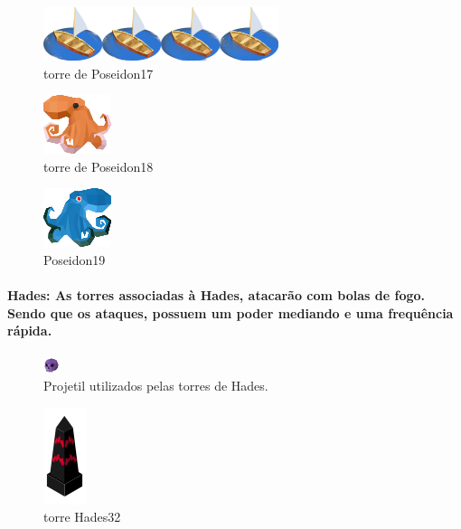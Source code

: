 \documentclass[11pt]{article} %
\begin{document}
\begin{figure}[!htp]
\centering
\includegraphics[scale=1.3]{res/towers/tower_17.png}
\caption{torre de Poseidon17}
\end{figure}


\begin{figure}[!htp]
\centering
\includegraphics[scale=1.3]{res/towers/tower_18.png}
\caption{torre de Poseidon18}
\end{figure}


\begin{figure}[!htp]
\centering
\includegraphics[scale=1.3]{res/towers/tower_19.png}
\caption{Poseidon19}
\end{figure}

\newpage

\paragraph{{\Large Hades}: As torres associadas à Hades, atacarão com bolas de fogo. Sendo que os ataques, possuem um poder mediando e uma frequência rápida.}

\begin{figure}[!htp]
\centering
\includegraphics[scale=1]{res/projectiles/projetil_caveira.png}
\caption{Projetil utilizados pelas torres de Hades.}
\end{figure}

\begin{figure}[!htp]
\centering
\includegraphics[scale=1]{res/towers/tower_32.png}
\caption{torre Hades32}
\end{figure}
\end{document}
